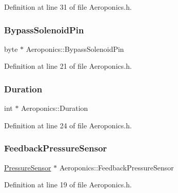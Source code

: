Definition at line 31 of file Aeroponics.\+h.

\mbox{\label{class_aeroponics_a1766a5f98fad0aa6fe5d3cff2be6b26a}} 
\subsubsection{\texorpdfstring{Bypass\+Solenoid\+Pin}{BypassSolenoidPin}}
{\footnotesize\ttfamily byte $\ast$ Aeroponics\+::\+Bypass\+Solenoid\+Pin\hspace{0.3cm}{\ttfamily [protected]}}



Definition at line 21 of file Aeroponics.\+h.

\mbox{\label{class_aeroponics_a477be5d422410bb62a70a279a9f7d9f9}} 
\subsubsection{\texorpdfstring{Duration}{Duration}}
{\footnotesize\ttfamily int $\ast$ Aeroponics\+::\+Duration\hspace{0.3cm}{\ttfamily [protected]}}



Definition at line 24 of file Aeroponics.\+h.

\mbox{\label{class_aeroponics_ab5e9a2fe86a36e1e84876eb1366a2bfb}} 
\subsubsection{\texorpdfstring{Feedback\+Pressure\+Sensor}{FeedbackPressureSensor}}
{\footnotesize\ttfamily \hyperlink{class_pressure_sensor}{Pressure\+Sensor} $\ast$ Aeroponics\+::\+Feedback\+Pressure\+Sensor\hspace{0.3cm}{\ttfamily [protected]}}



Definition at line 19 of file Aeroponics.\+h.

